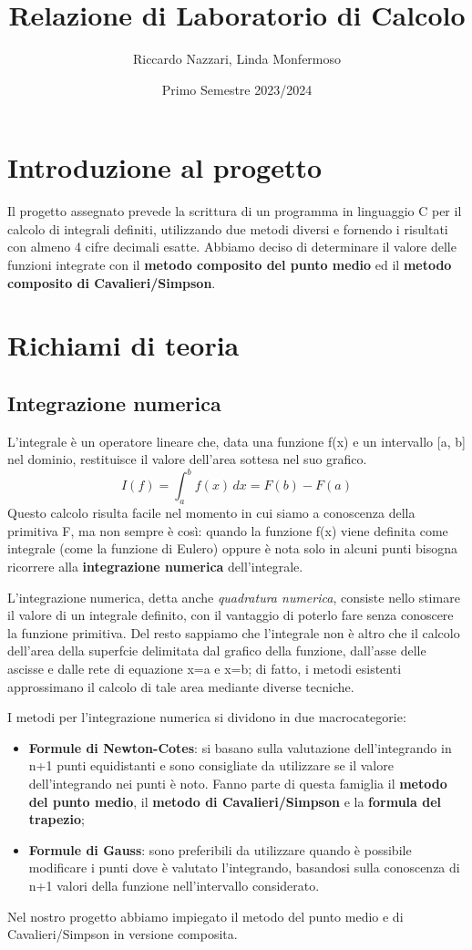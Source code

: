 \documentclass{article}
\title{Relazione di Laboratorio di Calcolo}
\author{Riccardo Nazzari, Linda Monfermoso}
\date{Primo Semestre 2023/2024}
\begin{document}
\maketitle

\section{Introduzione al progetto}
Il progetto assegnato prevede la scrittura di un programma in linguaggio C per il calcolo di integrali definiti,
utilizzando due metodi diversi e fornendo i risultati con almeno 4 cifre decimali esatte. Abbiamo deciso di determinare
il valore delle funzioni integrate con il \textbf{metodo composito del punto medio} ed il \textbf{metodo composito di Cavalieri/Simpson}.

\section{Richiami di teoria}
\subsection{Integrazione numerica}
L'integrale è un operatore lineare che, data una funzione f(x) e un intervallo [a, b] nel dominio, restituisce il valore 
dell'area sottesa nel suo grafico. 
\begin{equation*}
   I(f) =  \int_{a}^{b} f(x)\, dx = F(b) - F(a)
\end{equation*}
Questo calcolo risulta facile nel momento in cui siamo a conoscenza della primitiva F, ma non sempre è così: quando la funzione
f(x) viene definita come integrale (come la funzione di Eulero) oppure è nota solo in alcuni punti bisogna ricorrere alla
\textbf{integrazione numerica} dell'integrale.

L'integrazione numerica, detta anche \textit{quadratura numerica}, consiste nello stimare il valore di un integrale definito, 
con il vantaggio di poterlo fare senza conoscere la funzione primitiva. Del resto sappiamo che l'integrale non è altro che il calcolo 
dell'area della superfcie delimitata dal grafico della funzione, dall'asse delle ascisse e dalle rete di equazione x=a e x=b; di fatto, i 
metodi esistenti approssimano il calcolo di tale area mediante diverse tecniche.

I metodi per l'integrazione numerica si dividono in due macrocategorie:
\begin{itemize}
   \item \textbf{Formule di Newton-Cotes}: si basano sulla valutazione dell'integrando in n+1 punti equidistanti e sono consigliate da utilizzare se il valore dell'integrando  
   nei punti è noto. Fanno parte di questa famiglia il \textbf{metodo del punto medio}, il \textbf{metodo di Cavalieri/Simpson} e la \textbf{formula del trapezio};
   \item \textbf{Formule di Gauss}: sono preferibili da utilizzare quando è possibile modificare i punti dove è valutato l'integrando, basandosi 
   sulla conoscenza di n+1 valori della funzione nell'intervallo considerato.
\end{itemize}
Nel nostro progetto abbiamo impiegato il metodo del punto medio e di Cavalieri/Simpson in versione composita.
\end{document}
